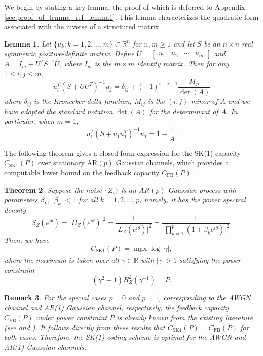 \documentclass[12pt]{article}
\newtheorem{thm}{Theorem}[section]
\newtheorem{lem}[thm]{Lemma}
\newtheorem{remark}[thm]{Remark}
\begin{document}
We begin by stating a key lemma, the proof of which is deferred to Appendix \ref{sec:proof_of_lemma_ref_lemma1}. This lemma characterizes the quadratic form associated with the inverse of a structured matrix.
\begin{lem}\label{lemma1}
Let $\{u_k;k=1,2,...,m\}\subset \mathbb{R}^{n}$ for $n,m \ge 1$ and let $S$ be an $n\times n$ real symmetric positive-definite matrix. Define $U = \begin{bmatrix} u_1 & u_2 & \cdots & u_m  \end{bmatrix}$ and $A = I_m +U^T S^{-1} U$, where $I_m$ is the $m\times m$ identity matrix. Then for any $1\le i,j\le m$,
$$
u_i^T (S+UU^T)^{-1}u_j= \delta_{ij} + (-1)^{i+j+1} \frac{ M_{ji}}{\det(A)}
$$
where $\delta_{ij}$ is the Kronecker delta function, $M_{ij}$ is the $(i, j)$-minor of $A$ and we have adopted the standard notation $\det(A)$ for the determinant of $A$. In particular, when $m=1$,
$$
u_1^T (S+u_1u_1^T)^{-1}u_1=  1-\frac{1}{A}.
$$
\end{lem}

The following theorem gives a closed-form expression for the SK(1) capacity $C_{\mathrm{SK1}}(P)$ over stationary AR$(p)$ Gaussian channels, which provides a computable lower bound on the feedback capacity $C_\mathrm{FB}(P)$.
\begin{thm}\label{ISK1-thm}
Suppose the noise $\{ Z_i \}$ is an $AR(p)$ Gaussian process with parameters $\beta_k$, $\vert \beta_k\vert<1$ for all $k=1,2,...,p$, namely, it has the power spectral density
\begin{equation*}
S_Z(e^{i\theta}) = \vert H_Z(e^{i\theta}) \vert^2 = \frac{1}{\vert L_Z(e^{i\theta}) \vert^2} = \frac{1}{\vert\prod_{k=1}^{p}(1+\beta_ke^{i\theta})\vert^2}.
\end{equation*}
Then, we have
\begin{equation}\label{I-SK1-thm}
C_\mathrm{SK1}(P)= \max_{\gamma} \log  |\gamma|,
\end{equation}
where the maximum is taken over all $\gamma\in\mathbb{R}$ with $|\gamma|>1$ satisfying the power constraint 
\begin{equation}\label{power-eqn-sk1-thm}
   (\gamma^2-1)H^2_Z(\gamma^{-1}) = P.
\end{equation}
\end{thm}
\begin{remark}\label{remark1:label}
For the special cases $p=0$ and $p=1$, corresponding to the AWGN channel and AR(1) Gaussian channel, respectively, the feedback capacity $C_{\mathrm{FB}}(P)$ under power constraint $P$ is already known from the existing literature (see \cite{kim2009feedback,yang2007feedback} and \cite[Theorem 5.2]{su2024feedback}). It follows directly from these results that $C_\mathrm{SK1}(P)=C_{\mathrm{FB}}(P)$ for both cases. Therefore, the SK(1) coding scheme is optimal for the AWGN and AR(1) Gaussian channels.
\end{remark}
\end{document}

